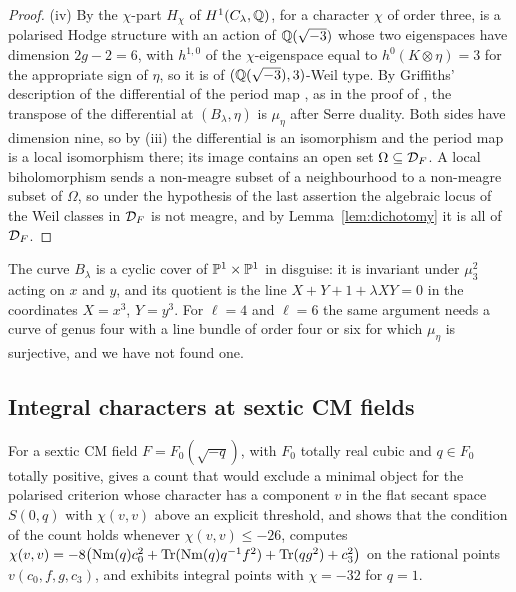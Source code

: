 \begin{proof}
(iv) By \cite[Prop.~23.13(i), (ii)]{BMB26} the $\chi$-part $H_{\chi}$ of $H^{1}(C_{\lambda},\mathbb{Q})$, for a character $\chi$ of order three, is a polarised Hodge structure with an action of $\mathbb{Q}(\sqrt{-3})$ whose two eigenspaces have dimension $2g-2=6$, with $h^{1,0}$ of the $\chi$-eigenspace equal to $h^{0}(K\otimes\eta)=3$ for the appropriate sign of $\eta$, so it is of $(\mathbb{Q}(\sqrt{-3}),3)$-Weil type. By Griffiths' description of the differential of the period map \cite[Ch.~10]{Voi02}, as in the proof of \cite[Prop.~23.13(iv)]{BMB26}, the transpose of the differential at $(B_{\lambda},\eta)$ is $\mu_{\eta}$ after Serre duality. Both sides have dimension nine, so by (iii) the differential is an isomorphism and the period map is a local isomorphism there; its image contains an open set $\Omega\subseteq\mathcal{D}_{F}$. A local biholomorphism sends a non-meagre subset of a neighbourhood to a non-meagre subset of $\Omega$, so under the hypothesis of the last assertion the algebraic locus of the Weil classes in $\mathcal{D}_{F}$ is not meagre, and by Lemma~\ref{lem:dichotomy} it is all of $\mathcal{D}_{F}$.
\end{proof}

The curve $B_{\lambda}$ is a cyclic cover of $\mathbb{P}^{1}\times\mathbb{P}^{1}$ in disguise: it is invariant under $\mu_{3}^{2}$ acting on $x$ and $y$, and its quotient is the line $X+Y+1+\lambda XY=0$ in the coordinates $X=x^{3}$, $Y=y^{3}$. For $\ell=4$ and $\ell=6$ the same argument needs a curve of genus four with a line bundle of order four or six for which $\mu_{\eta}$ is surjective, and we have not found one.

\subsection{Integral characters at sextic CM fields}\label{ssec:sexticfields}

For a sextic CM field $F=F_{0}(\sqrt{-q})$, with $F_{0}$ totally real cubic and $q\in F_{0}$ totally positive, \cite[Prop.~19.47]{BMB26} gives a count that would exclude a minimal object for the polarised criterion whose character has a component $v$ in the flat secant space $S(0,q)$ with $\chi(v,v)$ above an explicit threshold, and \cite[Prop.~19.49]{BMB26} shows that the condition of the count holds whenever $\chi(v,v)\le-26$, computes $\chi(v,v)=-8\bigl(\mathrm{Nm}(q)c_{0}^{2}+\mathrm{Tr}(\mathrm{Nm}(q)q^{-1}f^{2})+\mathrm{Tr}(qg^{2})+c_{3}^{2}\bigr)$ on the rational points $v(c_{0},f,g,c_{3})$, and exhibits integral points with $\chi=-32$ for $q=1$.

